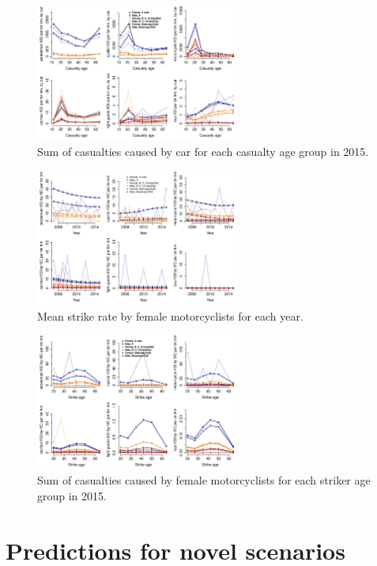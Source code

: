 \documentclass{article}
\begin{document}
\begin{figure}[H]
\centering
\includegraphics[width=0.6\textwidth]{pred6Age2015Car.pdf}
\caption{\small Sum of casualties caused by car for each casualty age group in 2015.}
\label{pred6Age2015Car}
\end{figure}

\begin{figure}[H]
\centering
\includegraphics[width=0.6\textwidth]{pred6yearMC.pdf}
\caption{\small Mean strike rate by female motorcyclists for each year.}
\label{pred6yearMC}
\end{figure}

\begin{figure}[H]
\centering
\includegraphics[width=0.6\textwidth]{pred6Age2015MC.pdf}
\caption{\small Sum of casualties caused by female motorcyclists for each striker age group in 2015.}
\label{pred6Age2015MC}
\end{figure}

\section{Predictions for novel scenarios}
\end{document}
